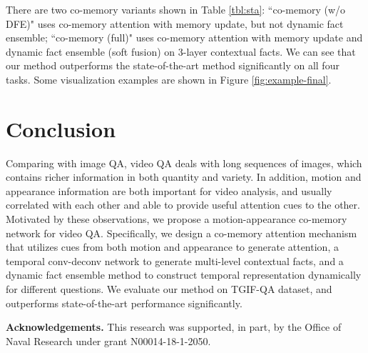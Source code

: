 \documentclass[10pt,twocolumn,letterpaper]{article}
\begin{document}
There are two co-memory variants shown in Table \ref{tbl:sta}: ``co-memory (w/o DFE)" uses co-memory attention with  memory update, but not dynamic fact ensemble; ``co-memory (full)" uses co-memory attention with  memory update and dynamic fact ensemble (soft fusion) on 3-layer contextual facts. We can see that our method outperforms the state-of-the-art method significantly on all four tasks. Some visualization examples are shown in Figure \ref{fig:example-final}.





\section{Conclusion}
Comparing with image QA, video QA deals with long sequences of images, which contains richer information in both quantity and variety. In addition, motion and appearance information are both important for video analysis, and usually correlated with each other and able to provide useful attention cues to the other. Motivated by these observations, we propose a motion-appearance co-memory network for video QA. Specifically, we design a co-memory attention mechanism that utilizes cues from both motion and appearance to generate attention,  a temporal conv-deconv network to generate multi-level contextual facts, and a dynamic fact ensemble method to construct temporal representation dynamically for different questions. We evaluate our method on TGIF-QA dataset, and outperforms state-of-the-art performance significantly.

\textbf{Acknowledgements.} This research was supported, in part, by the Office of Naval Research under grant N00014-18-1-2050.

{\small


}
\end{document}
